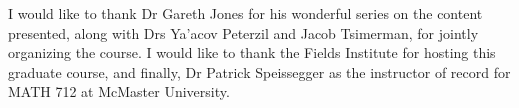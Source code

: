 %
%


I would like to thank Dr Gareth Jones for his wonderful series on the content presented, along with Drs Ya'acov Peterzil and Jacob Tsimerman, for jointly organizing the course. I would like to thank the Fields Institute for hosting this graduate course, and finally, Dr Patrick Speissegger as the instructor of record for MATH 712 at McMaster University.
